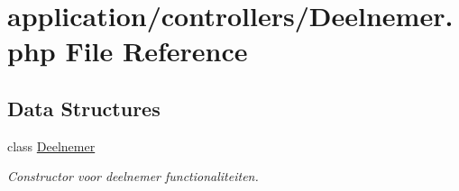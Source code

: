 \hypertarget{_deelnemer_8php}{}\section{application/controllers/\+Deelnemer.php File Reference}
\label{_deelnemer_8php}
\subsection*{Data Structures}
\begin{DoxyCompactItemize}
\item 
class \mbox{\hyperlink{class_deelnemer}{Deelnemer}}
\begin{DoxyCompactList}\small\item\em Constructor voor deelnemer functionaliteiten. \end{DoxyCompactList}\end{DoxyCompactItemize}
